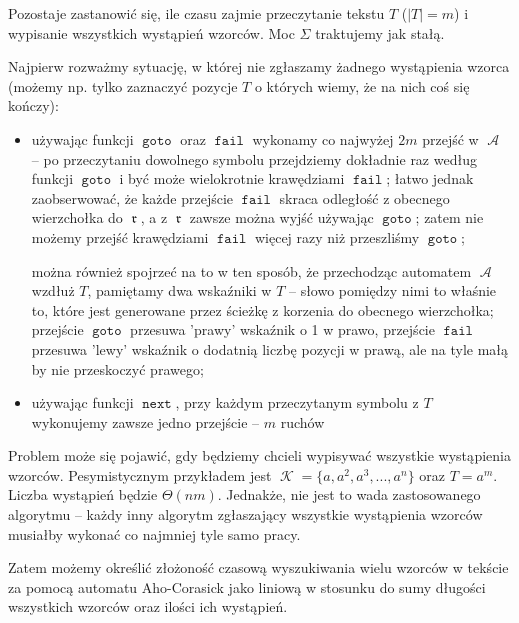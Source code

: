 \documentclass{article}
\DeclareMathOperator{\rot}{\mathfrak{r}}
\DeclareMathOperator{\K}{\mathcal{K}}
\DeclareMathOperator{\A}{\mathcal{A}}
\DeclareMathOperator{\goto}{\texttt{goto}}
\DeclareMathOperator{\next}{\texttt{next}}
\DeclareMathOperator{\fail}{\texttt{fail}}
\begin{document}
Pozostaje zastanowić się, ile czasu zajmie przeczytanie tekstu $T$ ($|T|=m$) i wypisanie wszystkich wystąpień wzorców. Moc $\Sigma$ traktujemy jak stałą.

Najpierw rozważmy sytuację, w której nie zgłaszamy żadnego wystąpienia wzorca (możemy np. tylko zaznaczyć pozycje $T$ o których wiemy, że na nich coś się kończy):
\begin{itemize}
    \item używając funkcji $\goto$ oraz $\fail$ wykonamy co najwyżej $2m$ przejść w $\A$ -- po przeczytaniu dowolnego symbolu przejdziemy dokładnie raz według funkcji $\goto$ i być może wielokrotnie krawędziami $\fail$; łatwo jednak zaobserwować, że każde przejście $\fail$ skraca odległość z obecnego wierzchołka do $\rot$, a z $\rot$ zawsze można wyjść używając $\goto$; zatem nie możemy przejść krawędziami $\fail$ więcej razy niż przeszliśmy $\goto$;
    
    można również spojrzeć na to w ten sposób, że przechodząc automatem $\A$ wzdłuż $T$, pamiętamy dwa wskaźniki w $T$ -- słowo pomiędzy nimi to właśnie to, które jest generowane przez ścieżkę z korzenia do obecnego wierzchołka; przejście $\goto$ przesuwa 'prawy' wskaźnik o 1 w prawo, przejście $\fail$ przesuwa 'lewy' wskaźnik o dodatnią liczbę pozycji w prawą, ale na tyle małą by nie przeskoczyć prawego;
    
    \item używając funkcji $\next$, przy każdym przeczytanym symbolu z $T$ wykonujemy zawsze jedno przejście -- $m$ ruchów
\end{itemize}

Problem może się pojawić, gdy będziemy chcieli wypisywać wszystkie wystąpienia wzorców. Pesymistycznym przykładem jest $\K=\{a,a^2,a^3,...,a^n\}$ oraz $T=a^m$. Liczba wystąpień będzie $\Theta(nm)$. Jednakże, nie jest to wada zastosowanego algorytmu -- każdy inny algorytm zgłaszający wszystkie wystąpienia wzorców musiałby wykonać co najmniej tyle samo pracy. 

Zatem możemy określić złożoność czasową wyszukiwania wielu wzorców w tekście za pomocą automatu Aho-Corasick jako liniową w stosunku do sumy długości wszystkich wzorców oraz ilości ich wystąpień.
\end{document}
